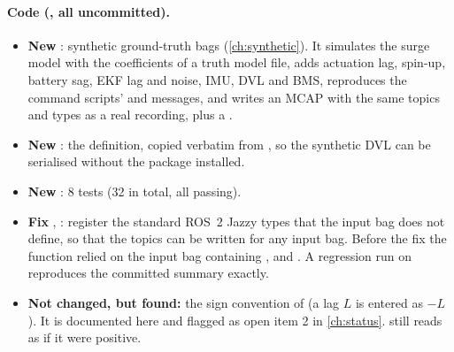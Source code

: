 \paragraph{Code (, all uncommitted).}
\begin{itemize}
  \item \textbf{New} : synthetic ground-truth bags
        (\cref{ch:synthetic}). It simulates the surge model with the coefficients of a truth
        model file, adds actuation lag, spin-up, battery sag, EKF lag and noise, IMU, DVL and BMS,
        reproduces the command scripts'  and  messages,
        and writes an MCAP with the same topics and types as a real recording, plus a
        .
  \item \textbf{New} : the  definition,
        copied verbatim from , so the synthetic DVL can be
        serialised without the package installed.
  \item \textbf{New} : 8 tests (32 in total, all passing).
  \item \textbf{Fix} , : register the standard ROS~2
        Jazzy types that the input bag does not define, so that the  topics can
        be written for any input bag. Before the fix the function relied on the input bag
        containing ,  and . A regression run
        on  reproduces the committed summary exactly.
  \item \textbf{Not changed, but found:} the sign convention of 
        (a lag $L$ is entered as $-L$). It is documented here and flagged as open item 2 in
        \cref{ch:status}.  still reads as if it were positive.
\end{itemize}

